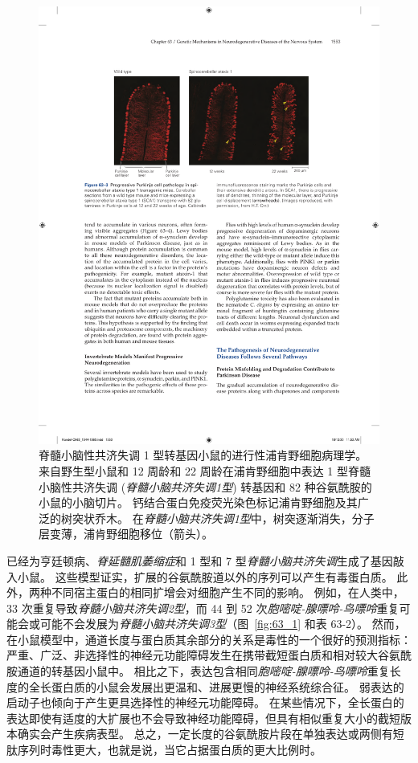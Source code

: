\begin{figure}[htbp]
	\centering
	\includegraphics[width=0.7\linewidth]{chap63/fig_63_3}
	\caption{脊髓小脑性共济失调 1 型转基因小鼠的进行性浦肯野细胞病理学。
		来自野生型小鼠和 12 周龄和 22 周龄在浦肯野细胞中表达 1 型脊髓小脑性共济失调 (\textit{脊髓小脑共济失调1型}) 转基因和 82 种谷氨酰胺的小鼠的小脑切片。
		钙结合蛋白免疫荧光染色标记浦肯野细胞及其广泛的树突状乔木。
		在\textit{脊髓小脑共济失调1型}中，树突逐渐消失，分子层变薄，浦肯野细胞移位（箭头）。}
	\label{fig:63_3}
\end{figure}


已经为亨廷顿病、\textit{脊延髓肌萎缩症}和 1 型和 7 型\textit{脊髓小脑共济失调}生成了基因敲入小鼠。
这些模型证实，扩展的谷氨酰胺道以外的序列可以产生有毒蛋白质。
此外，两种不同宿主蛋白的相同扩增会对细胞产生不同的影响。
例如，在人类中，33 次重复导致\textit{脊髓小脑共济失调2型}，而 44 到 52 次\textit{胞嘧啶-腺嘌呤-鸟嘌呤}重复可能会或可能不会发展为\textit{脊髓小脑共济失调3型}（图~\ref{fig:63_1} 和表 63-2）。
然而，在小鼠模型中，通道长度与蛋白质其余部分的关系是毒性的一个很好的预测指标：
严重、广泛、非选择性的神经元功能障碍发生在携带截短蛋白质和相对较大谷氨酰胺通道的转基因小鼠中。
相比之下，表达包含相同\textit{胞嘧啶-腺嘌呤-鸟嘌呤}重复长度的全长蛋白质的小鼠会发展出更温和、进展更慢的神经系统综合征。
弱表达的启动子也倾向于产生更具选择性的神经元功能障碍。
在某些情况下，全长蛋白的表达即使有适度的大扩展也不会导致神经功能障碍，但具有相似重复大小的截短版本确实会产生疾病表型。
总之，一定长度的谷氨酰胺片段在单独表达或两侧有短肽序列时毒性更大，也就是说，当它占据蛋白质的更大比例时。


